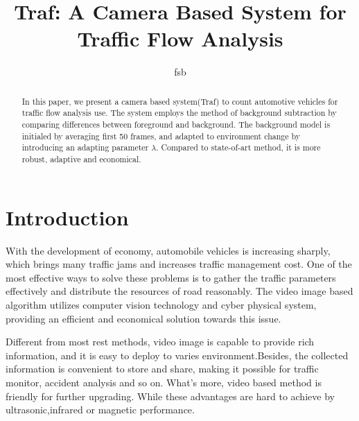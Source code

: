\documentclass[draftclsnofoot,onecolumn]{IEEEtran}
\begin{document}
\title{Traf: A Camera Based System for Traffic Flow Analysis}
\maketitle
\author{fsb}

\begin{abstract}

In this paper, we present a camera based system(Traf) to count automotive vehicles for traffic flow analysis use. The system employs the method of background subtraction by comparing differences between foreground and background. The background model is initialed by averaging first 50 frames, and adapted to environment change by introducing an adapting parameter $\lambda$. Compared to state-of-art method, it is more robust, adaptive and economical.

\end{abstract}


\section{Introduction}
With the development of economy, automobile vehicles is increasing sharply, which brings many traffic jams and increases traffic management cost. One of the most effective ways to solve these problems is to gather the traffic parameters effectively and distribute the resources of road reasonably. The video image based algorithm utilizes computer vision technology and cyber physical system, providing an efficient and economical solution towards this issue.

	Different from most rest methods, video image is capable to provide rich information, and it is easy to deploy to varies environment.Besides, the collected information is convenient to store and share, making it possible for traffic monitor, accident analysis and so on. What's more, video based method is friendly for further upgrading. While these advantages are hard to achieve by ultrasonic,infrared or magnetic performance.
\end{document}
